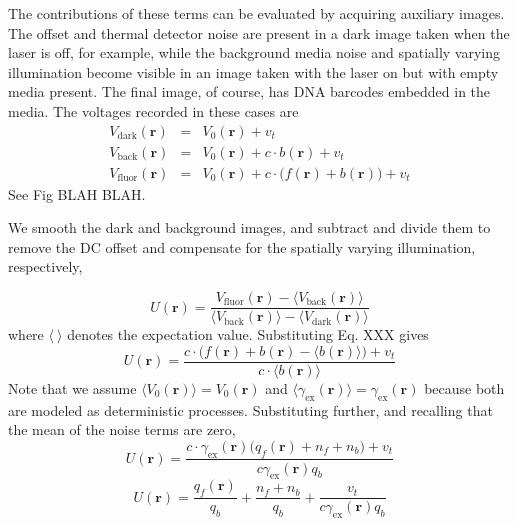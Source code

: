 The contributions of these terms can be evaluated by acquiring auxiliary images. The offset and thermal detector noise are present in a dark image taken when the laser is off, for example, while the background media noise and spatially varying illumination become visible in an image taken with the laser on but with empty media present. The final image, of course, has DNA barcodes embedded in the media. The voltages recorded in these cases are
\begin{eqnarray}
V_{\text{dark}}(\mathbf{r})&=&V_0(\mathbf{r})+v_t\\
V_{\text{back}}(\mathbf{r})&=&V_0(\mathbf{r})+c \cdot  b(\mathbf{r})  +v_t\\
V_{\text{fluor}}(\mathbf{r})&=&V_0(\mathbf{r})+c \cdot \big( f(\mathbf{r}) + b(\mathbf{r})\big)  +v_t
\end{eqnarray}
See Fig BLAH BLAH. 

We smooth the dark and background images, and subtract and divide them to remove the DC offset and compensate for the spatially varying illumination, respectively,

\begin{equation}
U(\mathbf{r})= \frac{ V_{\text{fluor}}(\mathbf{r}) - \langle V_{\text{back}}(\mathbf{r}) \rangle }{ \langle V_{\text{back}}(\mathbf{r}) \rangle - \langle V_{\text{dark}}(\mathbf{r}) \rangle}
\end{equation}
where $\langle~\rangle$ denotes the expectation value. 
Substituting Eq. XXX gives
\begin{equation}
U(\mathbf{r})= \frac{ c \cdot \big( f(\mathbf{r})  +b(\mathbf{r}) -\langle b(\mathbf{r}) \rangle \big)+ v_t  }{   c \cdot \langle b(\mathbf{r}) \rangle }
\end{equation}
Note that we assume $\langle V_0(\mathbf{r}) \rangle = V_0(\mathbf{r})$ and $\langle \gamma_{\text{ex}}(\mathbf{r}) \rangle  = \gamma_{\text{ex}}(\mathbf{r})$ because both are modeled as deterministic processes. Substituting further, and recalling that the mean of the noise terms are zero,
\begin{equation}
U(\mathbf{r})= \frac{ c \cdot \gamma_{\text{ex}}(\mathbf{r}) \big(  q_f(\mathbf{r}) + n_f       +   n_b   \big) + v_t  }{     c \gamma_{\text{ex}}(\mathbf{r})  q_b }
\end{equation}
\begin{equation}\label{eq:realDeal}
U(\mathbf{r})= \frac{ q_f(\mathbf{r}) }{ q_b} + \frac{n_f   +   n_b } {q_b}  + \frac{ v_t }{   c \gamma_{\text{ex}}(\mathbf{r}) q_b} 
\end{equation}


